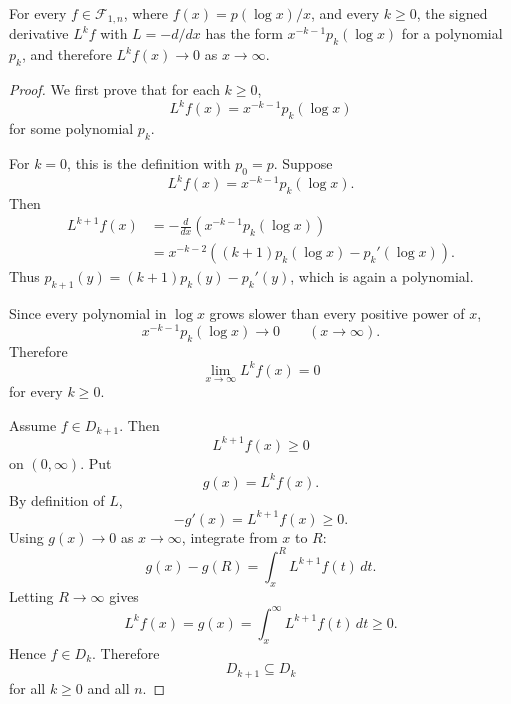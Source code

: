 \begin{lemma}
\label{res:log-function-signed-derivative-tail-vanishing}
For every \(f\in\mathcal F_{1,n}\), where \(f(x)=p(\log x)/x\), and every \(k\ge0\), the signed derivative \(L^k f\) with \(L=-d/dx\) has the form \(x^{-k-1}p_k(\log x)\) for a polynomial \(p_k\), and therefore \(L^k f(x)\to0\) as \(x\to\infty\).
\end{lemma}
\begin{proof}
We first prove that for each \(k\ge0\),
\[
L^k f(x)=x^{-k-1}p_k(\log x)
\]
for some polynomial \(p_k\).

For \(k=0\), this is the definition with \(p_0=p\).  Suppose
\[
L^k f(x)=x^{-k-1}p_k(\log x).
\]
Then
\[
\begin{aligned}
L^{k+1}f(x)
&=-\frac{d}{dx}\left(x^{-k-1}p_k(\log x)\right)\\
&=x^{-k-2}\left((k+1)p_k(\log x)-p_k'(\log x)\right).
\end{aligned}
\]
Thus \(p_{k+1}(y)=(k+1)p_k(y)-p_k'(y)\), which is again a polynomial.

Since every polynomial in \(\log x\) grows slower than every positive power of \(x\),
\[
x^{-k-1}p_k(\log x)\to0
\qquad (x\to\infty).
\]
Therefore
\[
\lim_{x\to\infty}L^k f(x)=0
\]
for every \(k\ge0\).

Assume \(f\in D_{k+1}\).  Then
\[
L^{k+1}f(x)\ge0
\]
on \((0,\infty)\).  Put
\[
g(x)=L^k f(x).
\]
By definition of \(L\),
\[
-g'(x)=L^{k+1}f(x)\ge0.
\]
Using \(g(x)\to0\) as \(x\to\infty\), integrate from \(x\) to \(R\):
\[
g(x)-g(R)=\int_x^R L^{k+1}f(t)\,dt.
\]
Letting \(R\to\infty\) gives
\[
L^k f(x)=g(x)=\int_x^\infty L^{k+1}f(t)\,dt\ge0.
\]
Hence \(f\in D_k\).  Therefore
\[
D_{k+1}\subseteq D_k
\]
for all \(k\ge0\) and all \(n\).
\end{proof}
